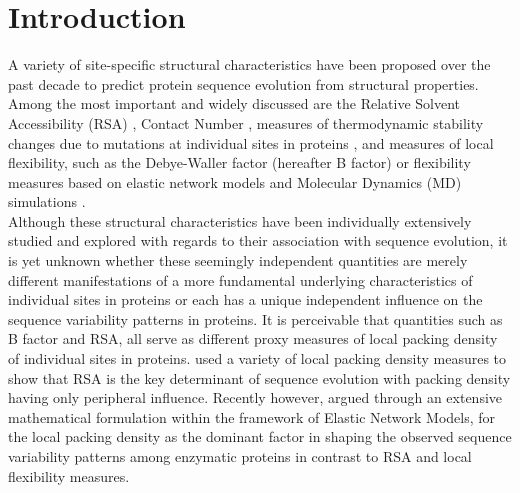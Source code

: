\documentclass[11pt]{article}
\begin{document}
\def\thefootnote{\fnsymbol{footnote}}
\setcounter{footnote}{0}
%

\section{Introduction}
\label{sec:intro}

    A variety of site-specific structural characteristics have been proposed over the past decade to predict protein sequence evolution from structural properties. Among the most important and widely discussed are the Relative Solvent Accessibility (RSA) \citep[e.g.,][]{goldman_assessing_1998, bustamante_solvent_2000, conant_solvent_2009, franzosa_structural_2009, ramsey_relationship_2011, scherrer_modeling_2012, meyer_integrating_2013, meyer_cross-species_2013, yeh_local_2014, yeh_site-specific_2014, shahmoradi_predicting_2014, sikosek_biophysics_2014, meyer_geometric_2015}, Contact Number \citep[e.g.,][]{rodionov_sequence_1998, hamelryck_amino_2005, liao_protein_2005, bloom_structural_2006, huang_mechanistic_2014, marcos_too_2015, yeh_site-specific_2014, yeh_local_2014, shahmoradi_predicting_2014, meyer_geometric_2015}, measures of thermodynamic stability changes due to mutations at individual sites in proteins \citep[e.g.,][]{echave_relationship_2014}, and measures of local flexibility, such as the Debye-Waller factor (hereafter B factor) \citep[e.g.,][]{liao_protein_2005, shih_evolutionary_2012, shahmoradi_predicting_2014} or flexibility measures based on elastic network models \citep[e.g.,][]{liu_sequence_2012} and Molecular Dynamics (MD) simulations \citep[e.g.,][]{shahmoradi_predicting_2014}. \\

    Although these structural characteristics have been individually extensively studied and explored with regards to their association with sequence evolution, it is yet unknown whether these seemingly independent quantities are merely different manifestations of a more fundamental underlying characteristics of individual sites in proteins or each has a unique independent influence on the sequence variability patterns in proteins. It is perceivable that quantities such as B factor and RSA, all serve as different proxy measures of local packing density of individual sites in proteins. \citet{franzosa_structural_2009} used a variety of local packing density measures to show that RSA is the key determinant of sequence evolution with packing density having only peripheral influence. Recently however, \citet{huang_mechanistic_2014} argued through an extensive mathematical formulation within the framework of Elastic Network Models, for the local packing density as the dominant factor in shaping the observed sequence variability patterns among enzymatic proteins in contrast to RSA and local flexibility measures. \\
\end{document}
